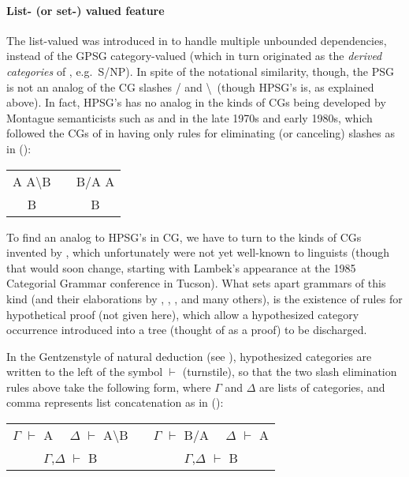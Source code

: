 \documentclass[output=paper
 	        ,biblatex
                ,babelshorthands
                ,newtxmath
                ,draftmode
                ,colorlinks, citecolor=brown
]{langscibook}
\begin{document}
\paragraph*{List- (or set-) valued \slasch feature} The list-valued \slasch was introduced in \citet{Pollard85a-u} to handle multiple unbounded dependencies, instead of the GPSG category-valued \slasch (which in turn originated as the \emph{derived categories} of  \citet{Gazdar81a}, e.g.~S/NP). In spite of the notational similarity, though, the PSG \slasch is not an analog of the CG slashes / and \textbackslash \ (though HPSG's \subcat is, as explained above). In fact, HPSG's \slasch has no analog in the kinds of CGs being developed by Montague semanticists such as \citet{Bach79a,Bach80a} and \citet{Dowty82a-u} in the late 1970s and early 1980s, which followed the CGs of \citet{Bar-Hillel54-u} in having only rules for eliminating (or canceling) slashes as in ():

\ea
\begin{tabular}[t]{ccc}
A A{\textbackslash}B  & &     B/A A \\ \cline{1-1} \cline{3-3}
B & & B 
\end{tabular}
\z

\noindent
To find an analog to HPSG's \slasch in CG, we have to turn to the kinds of CGs invented by \citet{Lambek1958}, which unfortunately were not yet well-known to linguists (though that would soon change, starting with Lambek's appearance at the 1985 Categorial Grammar conference in Tucson). What sets apart grammars 
of this kind (and their elaborations by \citet{Moortgat89a-u}, \citet{OBW88a-ed}, \citet{Morrill94a-u}, and many others), is the existence of rules for hypothetical proof (not given here), which allow a hypothesized category occurrence introduced into a tree (thought of as a proof) to be discharged. 

In the Gentzen\addref style of natural deduction (see \citealt{Pollard:2013}), hypothesized categories are written to the left of the symbol $\vdash$ (turnstile), so that the two slash elimination rules above take the following form, where $\Gamma$ and $\Delta$ are lists of categories, and comma represents list concatenation as in ():

\ea
\begin{tabular}[t]{ccc}
$\Gamma$ $\vdash$ A \ \ $\Delta$ $\vdash$ A{\textbackslash}B  & &     $\Gamma$ $\vdash$ B/A \ \ $\Delta$ $\vdash$ A \\ \cline{1-1} \cline{3-3}
$\Gamma$,$\Delta$ $\vdash$ B & & $\Gamma$,$\Delta$ $\vdash$ B 
\end{tabular}
\z
\end{document}
